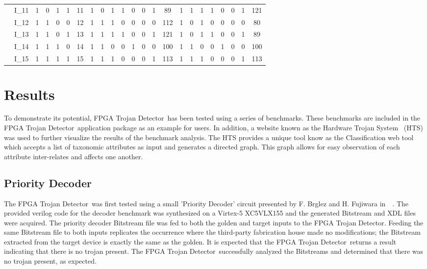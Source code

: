 \documentclass[conference]{IEEEtran}
\newcommand{\Name}{\acrshort{FPGA} Trojan Detector}
\newcommand{\NameNoPeriod}{\Name~}
\begin{document}
\begin{table}[b!]
\begin{tabular}{CC|C|C|C|C|C||C|C|C|C|C|C|C|C||C|C|C|C|C|C|C|C|}
		 & I_{11} & 1 & 0 & 1 & 1 & 11 & 1 & 0 & 1 & 1 & 0 & 0 & 1 & 89 & 1 & 1 & 1 & 1 & 0 & 0 & 1 & 121 \\ 
		 & I_{12} & 1 & 1 & 0 & 0 & 12 & 1 & 1 & 1 & 0 & 0 & 0 & 0 & 112 & 1 & 0 & 1 & 0 & 0 & 0 & 0 & 80 \\ 
		 & I_{13} & 1 & 1 & 0 & 1 & 13 & 1 & 1 & 1 & 1 & 0 & 0 & 1 & 121 & 1 & 0 & 1 & 1 & 0 & 0 & 1 & 89 \\ 
		 & I_{14} & 1 & 1 & 1 & 0 & 14 & 1 & 1 & 0 & 0 & 1 & 0 & 0 & 100 & 1 & 1 & 0 & 0 & 1 & 0 & 0 & 100 \\ 
		 & I_{15} & 1 & 1 & 1 & 1 & 15 & 1 & 1 & 1 & 0 & 0 & 0 & 1 & 113 & 1 & 1 & 1 & 0 & 0 & 0 & 1 & 113 \\ \hline
	\end{tabular}
\end{table}
\section{Results} \label{sec:results}
To demonstrate its potential, \NameNoPeriod has been tested using a series of benchmarks.
These benchmarks are included in the \NameNoPeriod application package as an example for users.
In addition, a website known as the Hardware Trojan System~\cite{meCategorization} (HTS) was used to further visualize the results of the benchmark analysis.
The \acrshort{HTS} provides a unique tool know as the Classification web tool which accepts a list of taxonomic attributes as input and generates a directed graph.
This graph allows for easy observation of each attribute inter-relates and affects one another.

\subsection{Priority Decoder} \label{sec:priorityDecoder}
The \NameNoPeriod was first tested using a small 'Priority Decoder' circuit presented by F. Brglez and H. Fujiwara
in~~\cite{iscas85}.
The provided verilog code for the decoder benchmark was synthesized on a Virtex-5 XC5VLX155 and the generated \gls{Bitstream} and \acrshort{XDL} files were acquired.
The priority decoder \gls{Bitstream} file was fed to both the \gls{golden} and \gls{target} inputs to the \Name.
Feeding the same \gls{Bitstream} file to both inputs replicates the occurrence where the third-party fabrication house made no modifications; the \gls{Bitstream} extracted from the \gls{target} device is exactly the same as the \gls{golden}.
It is expected that the \NameNoPeriod returns a result indicating that there is no trojan present.
The \NameNoPeriod successfully analyzed the \gls{Bitstream}s and determined that there was no trojan present, as expected.
\end{document}
